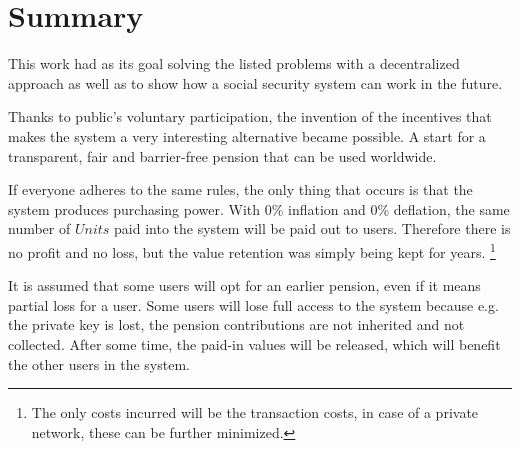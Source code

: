 \section{Summary}

This work had as its goal solving the listed problems with a decentralized approach as well as to show how a social security system can work in the future.

Thanks to public's voluntary participation, the invention of the incentives that makes the system a very interesting alternative became possible. A start for a transparent, fair and barrier-free pension that can be used worldwide.


If everyone adheres to the same rules, the only thing that occurs is that the system produces purchasing power. With 0\% inflation and 0\% deflation, the same number of $Units$ paid into the system will be paid out to users. Therefore there is no profit and no loss, but the value retention was simply being kept for years. \footnote{ The only costs incurred will be the transaction costs, in case of a private network, these can be further minimized.}

It is assumed that some users will opt for an earlier pension, even if it means partial loss for a user. Some users will lose full access to the system because e.g. the private key is lost, the pension contributions are not inherited and not collected. After some time, the paid-in values will be released, which will benefit the other users in the system.


